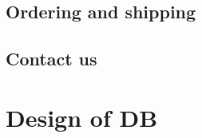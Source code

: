 \documentclass[12pt,a4paper]{article}
\begin{document}
\newpage
\subsection{Ordering and shipping}

\newpage
\subsection{Contact us}



\newpage
\section{Design of DB} 	
\end{document}
